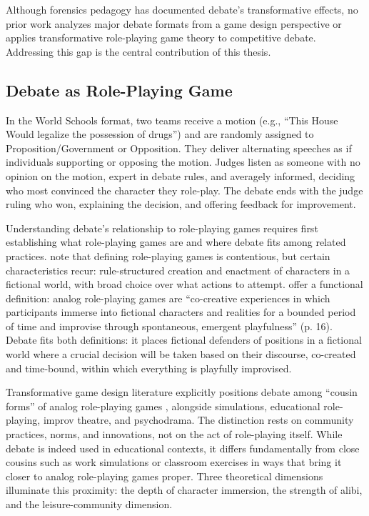 Although forensics pedagogy has documented debate's transformative effects, no prior work analyzes major debate formats from a game design perspective or applies transformative role-playing game theory to competitive debate. Addressing this gap is the central contribution of this thesis.

\subsection{Debate as Role-Playing Game}

In the World Schools format, two teams receive a motion (e.g., ``This House Would legalize the possession of drugs'') and are randomly assigned to Proposition/Government or Opposition. They deliver alternating speeches as if individuals supporting or opposing the motion. Judges listen as someone with no opinion on the motion, expert in debate rules, and averagely informed, deciding who most convinced the character they role-play. The debate ends with the judge ruling who won, explaining the decision, and offering feedback for improvement.

Understanding debate's relationship to role-playing games requires first establishing what role-playing games are and where debate fits among related practices. \textcite{zagal2024definitions} note that defining role-playing games is contentious, but certain characteristics recur: rule-structured creation and enactment of characters in a fictional world, with broad choice over what actions to attempt. \textcite{bowman2025transformative} offer a functional definition: analog role-playing games are ``co-creative experiences in which participants immerse into fictional characters and realities for a bounded period of time and improvise through spontaneous, emergent playfulness'' (p. 16). Debate fits both definitions: it places fictional defenders of positions in a fictional world where a crucial decision will be taken based on their discourse, co-created and time-bound, within which everything is playfully improvised.

Transformative game design literature explicitly positions debate among ``cousin forms'' of analog role-playing games \parencite{bowman2014educational,bowman2025transformative}, alongside simulations, educational role-playing, improv theatre, and psychodrama. The distinction rests on community practices, norms, and innovations, not on the act of role-playing itself. While debate is indeed used in educational contexts, it differs fundamentally from close cousins such as work simulations or classroom exercises in ways that bring it closer to analog role-playing games proper. Three theoretical dimensions illuminate this proximity: the depth of character immersion, the strength of alibi, and the leisure-community dimension.

